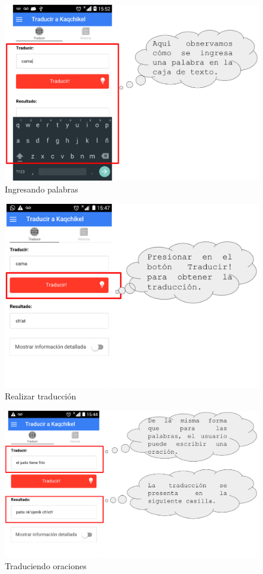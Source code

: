\documentclass[landscape,12pt]{article}
\begin{document}
\begin{figure}[htb]
	  \centering
	\includegraphics[width=17cm]{ml_3}
	\caption{Ingresando palabras}
	\label{fig:ml3}
\end{figure}
\newpage

\begin{figure}[htb]
	  \centering
	\includegraphics[width=16cm]{ml_4}
	\caption{Realizar traducción}
	\label{fig:ml4}
\end{figure}
\newpage

\begin{figure}[htb]
	\centering
	\includegraphics[width=18cm]{ml_5}
	\caption{Traduciendo oraciones}
	\label{fig:ml5}
\end{figure}
\newpage
\end{document}

